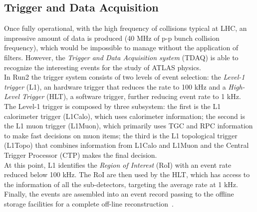 \subsection{Trigger and Data Acquisition}
\label{sec:TrigSys}
Once fully operational, with the high frequency of collisions typical at LHC, an impressive amount of data is produced (40 MHz of p-p bunch collision frequency), 
which would be impossible to manage without the application of filters.
However, the \textit{Trigger and Data Acquisition system} (TDAQ) is able to recognize the interesting events for the study of ATLAS physics.\\
In Run2 the trigger system consists of two levels of event selection: the \textit{Level-1 trigger} (L1), an hardware trigger that reduces the rate to 100 kHz and a 
\textit{High-Level Trigger} (HLT), a software trigger, further reducing event rate to 1 kHz.\\
The Level-1 trigger is composed by three subsystem: 
the first is the L1 calorimeter trigger (L1Calo), which uses calorimeter information; 
the second is the L1 muon trigger (L1Muon), which primarily uses TGC and RPC information to make fast decisions on muon items; 
the third is the L1 topological trigger (L1Topo) that combines information from L1Calo and L1Muon and the Central Trigger Processor (CTP) makes the final decision.\\
At this point, L1 identifies the \textit{Region of Interest} (RoI) with an event rate reduced  below 100 kHz.
The RoI are then used by the HLT, which has access to the information of all the sub-detectors, targeting the average rate at 1 kHz.\\
Finally, the events are assembled into an event record passing to the offline storage facilities for a complete off-line reconstruction~\cite{TrigSys}.






